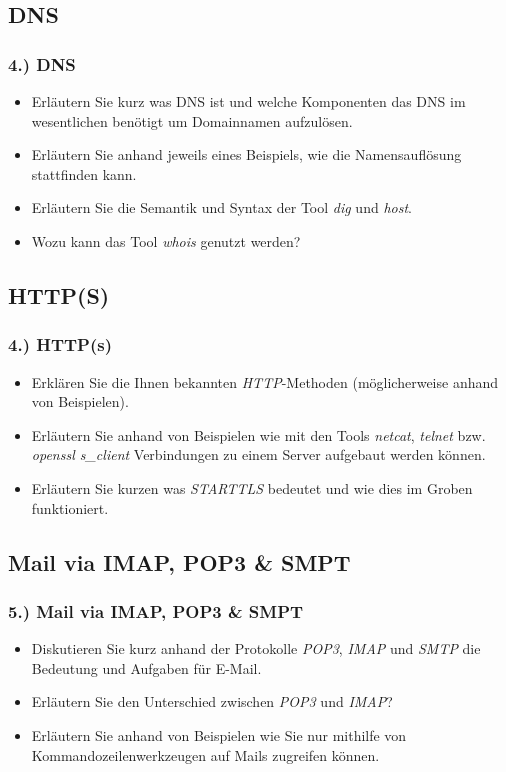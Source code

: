 \documentclass[xcolor=dvipsnames, aspectratio=169]{beamer}
\begin{document}
\subsection{DNS}
\begin{frame}
	\frametitle{4.) DNS}
	\begin{itemize}
		\item Erläutern Sie kurz was DNS ist und welche Komponenten das DNS im wesentlichen benötigt um Domainnamen aufzulösen.
		\item Erläutern Sie anhand jeweils eines Beispiels, wie die Namensauflösung stattfinden kann.
		\item Erläutern Sie die Semantik und Syntax der Tool \emph{dig} und \emph{host}. 
		\item Wozu kann das Tool \emph{whois} genutzt werden?
	\end{itemize}
\end{frame}


\subsection{HTTP(S)}
\begin{frame}
	\frametitle{4.) HTTP(s)}
	\begin{itemize}
		\item Erklären Sie die Ihnen bekannten \emph{HTTP}-Methoden (möglicherweise anhand von Beispielen).
		\item Erläutern Sie anhand von Beispielen wie mit den Tools \emph{netcat}, \emph{telnet} bzw. \emph{openssl s\_client} Verbindungen zu einem Server aufgebaut werden können.
		\item Erläutern Sie kurzen was \emph{STARTTLS} bedeutet und wie dies im Groben funktioniert.
	\end{itemize}
\end{frame}

\subsection{Mail via IMAP, POP3 \& SMPT}
\begin{frame}
\frametitle{5.) Mail via IMAP, POP3 \& SMPT}
	\begin{itemize}
		\item Diskutieren Sie kurz anhand der Protokolle \emph{POP3}, \emph{IMAP} und \emph{SMTP} die Bedeutung und Aufgaben für E-Mail. 
		\item Erläutern Sie den Unterschied zwischen \emph{POP3} und \emph{IMAP}?
		\item Erläutern Sie anhand von Beispielen wie Sie nur mithilfe von Kommandozeilenwerkzeugen auf Mails zugreifen können.
	\end{itemize}
\end{frame}
\end{document}
